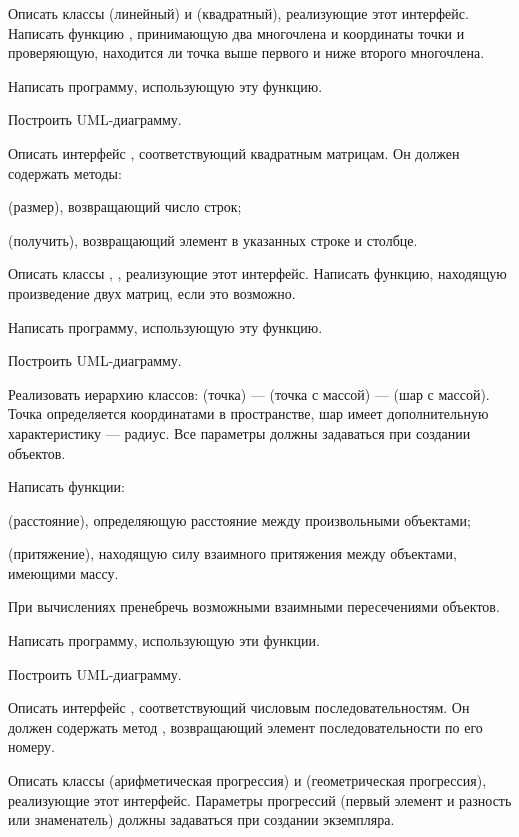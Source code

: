 Описать классы  (линейный) и  (квадратный),
реализующие этот интерфейс. Написать функцию ,
принимающую два многочлена и координаты точки и проверяющую, находится
ли точка выше первого и ниже второго многочлена.

Написать программу, использующую эту функцию.

Построить UML-диаграмму.

\task Описать интерфейс , соответствующий квадратным
матрицам. Он должен содержать методы:
\begin{itemize*}
\item {} (размер), возвращающий число строк;
\item {} (получить), возвращающий элемент в указанных строке и
  столбце.
\end{itemize*}

Описать классы , , реализующие этот
интерфейс. Написать функцию, находящую произведение двух матриц, если
это возможно.

Написать программу, использующую эту функцию.

Построить UML-диаграмму.

\task Реализовать иерархию классов:  (точка) —
 (точка с массой) —  (шар с
массой). Точка определяется координатами в пространстве, шар имеет
дополнительную характеристику — радиус. Все параметры должны
задаваться при создании объектов.

Написать функции:
\begin{itemize*}
\item {} (расстояние), определяющую расстояние между
  произвольными объектами;
\item {} (притяжение), находящую силу взаимного
  притяжения между объектами, имеющими массу.
\end{itemize*}
При вычислениях пренебречь возможными взаимными пересечениями
объектов.

Написать программу, использующую эти функции.

Построить UML-диаграмму.

\task Описать интерфейс , соответствующий числовым
последовательностям. Он должен содержать метод ,
возвращающий элемент последовательности по его номеру.

Описать классы  (арифметическая прогрессия)
и  (геометрическая прогрессия), реализующие
этот интерфейс. Параметры прогрессий (первый элемент и разность или
знаменатель) должны задаваться при создании экземпляра.

